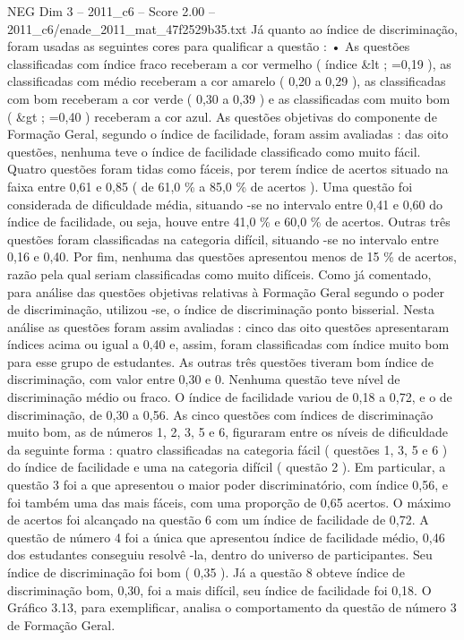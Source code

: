 \begin{textsample}{NEG Dim 3 – 2011\_c6 – Score 2.00 – 2011\_c6/enade\_2011\_mat\_47f2529b35.txt}
Já quanto ao índice de discriminação, foram usadas as seguintes cores para qualificar a questão : • As questões classificadas com índice fraco receberam a cor vermelho ( índice \&lt ; =0,19 ), as classificadas com médio receberam a cor amarelo ( 0,20 a 0,29 ), as classificadas com bom receberam a cor verde ( 0,30 a 0,39 ) e as classificadas com muito bom ( \&gt ; =0,40 ) receberam a cor azul.
As questões objetivas do componente de Formação Geral, segundo o índice de facilidade, foram assim avaliadas : das oito questões, nenhuma teve o índice de facilidade classificado como muito fácil.
Quatro questões foram tidas como fáceis, por terem índice de acertos situado na faixa entre 0,61 e 0,85 ( de 61,0 \% a 85,0 \% de acertos ).
Uma questão foi considerada de dificuldade média, situando -se no intervalo entre 0,41 e 0,60 do índice de facilidade, ou seja, houve entre 41,0 \% e 60,0 \% de acertos.
Outras três questões foram classificadas na categoria difícil, situando -se no intervalo entre 0,16 e 0,40.
Por fim, nenhuma das questões apresentou menos de 15 \% de acertos, razão pela qual seriam classificadas como muito difíceis.
Como já comentado, para análise das questões objetivas relativas à Formação Geral segundo o poder de discriminação, utilizou -se, o índice de discriminação ponto bisserial.
Nesta análise as questões foram assim avaliadas : cinco das oito questões apresentaram índices acima ou igual a 0,40 e, assim, foram classificadas com índice muito bom para esse grupo de estudantes.
As outras três questões tiveram bom índice de discriminação, com valor entre 0,30 e 0.
Nenhuma questão teve nível de discriminação médio ou fraco.
O índice de facilidade variou de 0,18 a 0,72, e o de discriminação, de 0,30 a 0,56.
As cinco questões com índices de discriminação muito bom, as de números 1, 2, 3, 5 e 6, figuraram entre os níveis de dificuldade da seguinte forma : quatro classificadas na categoria fácil ( questões 1, 3, 5 e 6 ) do índice de facilidade e uma na categoria difícil ( questão 2 ).
Em particular, a questão 3 foi a que apresentou o maior poder discriminatório, com índice 0,56, e foi também uma das mais fáceis, com uma proporção de 0,65 acertos.
O máximo de acertos foi alcançado na questão 6 com um índice de facilidade de 0,72.
A questão de número 4 foi a única que apresentou índice de facilidade médio, 0,46 dos estudantes conseguiu resolvê -la, dentro do universo de participantes.
Seu índice de discriminação foi bom ( 0,35 ).
Já a questão 8 obteve índice de discriminação bom, 0,30, foi a mais difícil, seu índice de facilidade foi 0,18.
O Gráfico 3.13, para exemplificar, analisa o comportamento da questão de número 3 de Formação Geral.

\end{textsample}
